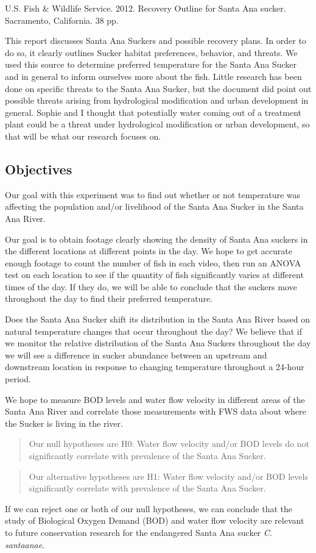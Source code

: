 \documentclass{article}\usepackage[]{graphicx}\usepackage[]{color}
\begin{document}
U.S. Fish \& Wildlife Service. 2012. Recovery Outline for Santa Ana sucker. Sacramento, California. 38 pp.

This report discusses Santa Ana Suckers and possible recovery plans. In order to do so, it clearly outlines Sucker habitat preferences, behavior, and threats. We used this source to determine preferred temperature for the Santa Ana Sucker and in general to inform ourselves more about the fish. Little research has been done on specific threats to the Santa Ana Sucker, but the document did point out possible threats arising from hydrological modification and urban development in general. Sophie and I thought that potentially water coming out of a treatment plant could be a threat under hydrological modification or urban development, so that will be what our research focuses on.

\subsection{Objectives}
Our goal with this experiment was to find out whether or not temperature was affecting the population and/or livelihood of the Santa Ana Sucker in the Santa Ana River.

Our goal is to obtain footage clearly showing the density of Santa Ana suckers in the different locations at different points in the day.  We hope to get accurate enough footage to count the number of fish in each video, then run an ANOVA test on each location to see if the quantity of fish significantly varies at different times of the day.  If they do, we will be able to conclude that the suckers move throughout the day to find their preferred temperature.

Does the Santa Ana Sucker shift its distribution in the Santa Ana River based on natural temperature changes that occur throughout the day? We believe that if we monitor the relative distribution of the Santa Ana Suckers throughout the day we will see a difference in sucker abundance between an upstream and downstream location in response to changing temperature throughout a 24-hour period.

We hope to measure BOD levels and water flow velocity in different areas of the Santa Ana River and correlate those measurements with FWS data about where the Sucker is living in the river.
\begin{quote}
Our null hypotheses are H0: Water flow velocity and/or BOD levels do not significantly correlate with prevalence of the Santa Ana Sucker.
\end{quote}
\begin{quote}
Our alternative hypotheses are H1: Water flow velocity and/or BOD levels significantly correlate with prevalence of the Santa Ana Sucker.
\end{quote}
If we can reject one or both of our null hypotheses, we can conclude that the study of Biological Oxygen Demand (BOD) and water flow velocity are relevant to future conservation research for the endangered Santa Ana sucker \emph{C. santaanae}.
\end{document}
